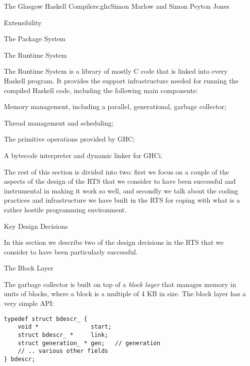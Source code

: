 \begin{aosachapter}{The Glasgow Haskell Compiler}{s:ghc}{Simon Marlow and Simon Peyton Jones}
\begin{aosasect1}{Extensibility}
\begin{aosasect2}{The Package System}
\end{aosasect2}

\end{aosasect1}

\begin{aosasect1}{The Runtime System}
\label{s:rts}

The Runtime System is a library of mostly C code
that is linked into every Haskell program.  It provides the support
infrastructure needed for running the compiled Haskell code, including
the following main components:

\begin{aosaitemize}

\item Memory management, including a parallel, generational, garbage
  collector;

\item Thread management and scheduling;

\item The primitive operations provided by GHC;

\item A bytecode interpreter and dynamic linker for GHCi.

\end{aosaitemize}

The rest of this section is divided into two: first we focus on a
couple of the aspects of the design of the RTS that we consider to
have been successful and instrumental in making it work so well, and
secondly we talk about the coding practices and infrastructure we have
built in the RTS for coping with what is a rather hostile programming
environment.

\begin{aosasect2}{Key Design Decisions}

In this section we describe two of the design decisions in the RTS
that we consider to have been particularly successful.

\begin{aosasect3}{The Block Layer}

The garbage collector is built on top of a \emph{block layer} that
manages memory in units of blocks, where a block is a multiple of 4 KB
in size.  The block layer has a very simple API:

\begin{verbatim}
typedef struct bdescr_ {
    void *               start;
    struct bdescr_ *     link;
    struct generation_ * gen;   // generation
    // .. various other fields
} bdescr;


\end{verbatim}
\end{aosasect3}
\end{aosasect2}
\end{aosasect1}
\end{aosachapter}

